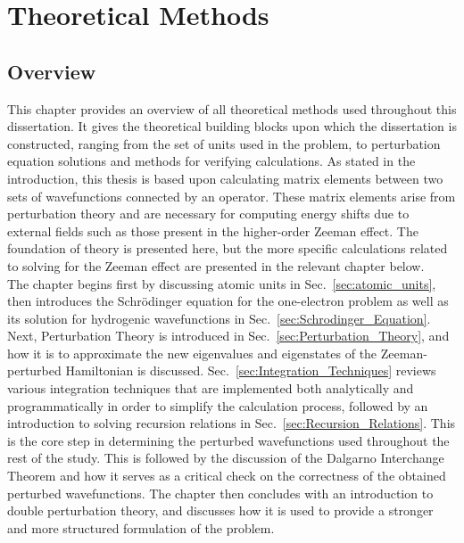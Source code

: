
\chapter{Theoretical Methods} \label{Theoretical_Methods}

\section{Overview}
        This chapter provides an overview of all theoretical methods used throughout this dissertation. It gives the theoretical building blocks upon which the dissertation is constructed, ranging from the set of units used in the problem, to perturbation equation solutions and methods for verifying calculations. As stated in the introduction, this thesis is based upon calculating matrix elements between two sets of wavefunctions connected by an operator. These matrix elements arise from perturbation theory and are necessary for computing energy shifts due to external fields such as those present in the higher-order Zeeman effect. The foundation of theory is presented here, but the more specific calculations related to solving for the Zeeman effect are presented in the relevant chapter below.\\

        The chapter begins first by discussing atomic units in Sec.~\ref{sec:atomic_units}, then introduces the Schrödinger equation for the one-electron problem as well as its solution for hydrogenic wavefunctions in Sec.~\ref{sec:Schrodinger_Equation}. Next, Perturbation Theory is introduced in Sec.~\ref{sec:Perturbation_Theory}, and how it is to approximate the new eigenvalues and eigenstates of the Zeeman-perturbed Hamiltonian is discussed. Sec.~\ref{sec:Integration_Techniques} reviews various integration techniques that are implemented both analytically and programmatically in order to simplify the calculation process, followed by an introduction to solving recursion relations in Sec.~\ref{sec:Recursion_Relations}. This is the core step in determining the perturbed wavefunctions used throughout the rest of the study. This is followed by the discussion of the Dalgarno Interchange Theorem and how it serves as a critical check on the correctness of the obtained perturbed wavefunctions. The chapter then concludes with an introduction to double perturbation theory, and discusses how it is used to provide a stronger and more structured formulation of the problem.

